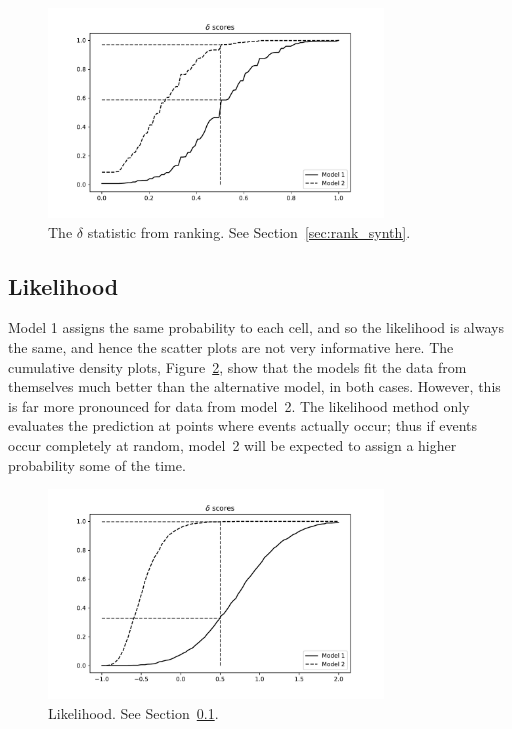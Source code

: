 \documentclass[twoside,a4paper,twocolumn,10pt]{article}
\theoremstyle{plain}
\theoremstyle{definition}
\begin{document}
\begin{figure}
  \includegraphics[width=3.5in]{../details/ranking2.pdf}
  \caption{The $\delta$ statistic from ranking.  See Section~\ref{sec:rank_synth}.}
   \label{fig:7}
\end{figure}



\subsection{Likelihood}\label{sec:like_synth}

Model 1 assigns the same probability to each cell, and so the likelihood is always
the same, and hence the scatter plots are not very informative here.  The cumulative
density plots, Figure~\ref{fig:8}, show that the models fit the data from themselves
much better than the alternative model, in both cases.  However, this is far more
pronounced for data from model~2.  The likelihood method only evaluates the prediction
at points where events actually occur; thus if events occur completely at random, model~2
will be expected to assign a higher probability some of the time.

\begin{figure}
  \includegraphics[width=3.5in]{../details/likelihood.pdf}
  \caption{Likelihood.  See Section~\ref{sec:like_synth}.}
   \label{fig:8}
\end{figure}
\end{document}
